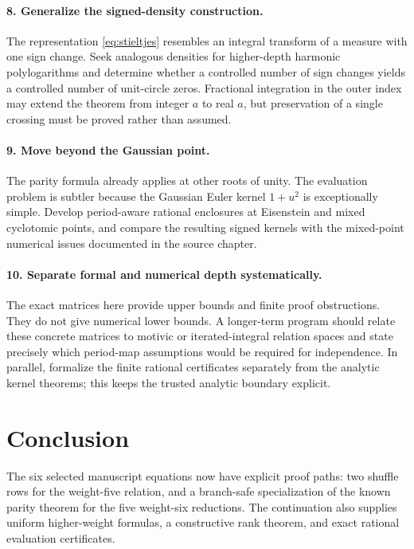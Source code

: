 \documentclass[11pt,a4paper]{article}
\numberwithin{equation}{section}
\theoremstyle{definition}
\theoremstyle{remark}
\begin{document}
\paragraph{8. Generalize the signed-density construction.}
The representation \eqref{eq:stieltjes} resembles an integral transform of a measure with one sign change. Seek analogous densities for higher-depth harmonic polylogarithms and determine whether a controlled number of sign changes yields a controlled number of unit-circle zeros. Fractional integration in the outer index may extend the theorem from integer $a$ to real $a$, but preservation of a single crossing must be proved rather than assumed.

\paragraph{9. Move beyond the Gaussian point.}
The parity formula already applies at other roots of unity. The evaluation problem is subtler because the Gaussian Euler kernel $1+u^2$ is exceptionally simple. Develop period-aware rational enclosures at Eisenstein and mixed cyclotomic points, and compare the resulting signed kernels with the mixed-point numerical issues documented in the source chapter.

\paragraph{10. Separate formal and numerical depth systematically.}
The exact matrices here provide upper bounds and finite proof obstructions. They do not give numerical lower bounds. A longer-term program should relate these concrete matrices to motivic or iterated-integral relation spaces and state precisely which period-map assumptions would be required for independence. In parallel, formalize the finite rational certificates separately from the analytic kernel theorems; this keeps the trusted analytic boundary explicit.

\section{Conclusion}
The six selected manuscript equations now have explicit proof paths: two shuffle rows for the weight-five relation, and a branch-safe specialization of the known parity theorem for the five weight-six reductions. The continuation also supplies uniform higher-weight formulas, a constructive rank theorem, and exact rational evaluation certificates.
\end{document}
